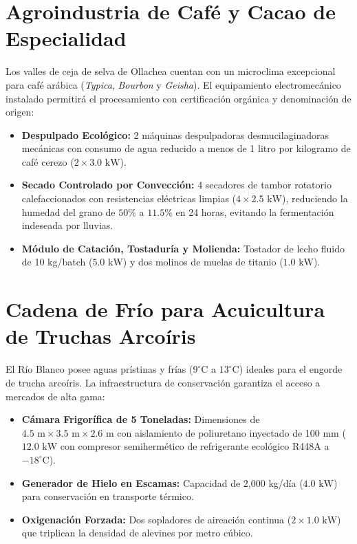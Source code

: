\documentclass[11pt,a4paper]{report}
\begin{document}
\section{Agroindustria de Café y Cacao de Especialidad}
Los valles de ceja de selva de Ollachea cuentan con un microclima excepcional para café arábica (\textit{Typica}, \textit{Bourbon} y \textit{Geisha}). El equipamiento electromecánico instalado permitirá el procesamiento con certificación orgánica y denominación de origen:
\begin{itemize}
    \item \textbf{Despulpado Ecológico:} 2 máquinas despulpadoras desmucilaginadoras mecánicas con consumo de agua reducido a menos de 1 litro por kilogramo de café cerezo ($2 \times 3.0\text{ kW}$).
    \item \textbf{Secado Controlado por Convección:} 4 secadores de tambor rotatorio calefaccionados con resistencias eléctricas limpias ($4 \times 2.5\text{ kW}$), reduciendo la humedad del grano de $50\%$ a $11.5\%$ en 24 horas, evitando la fermentación indeseada por lluvias.
    \item \textbf{Módulo de Catación, Tostaduría y Molienda:} Tostador de lecho fluido de 10 kg/batch ($5.0\text{ kW}$) y dos molinos de muelas de titanio ($1.0\text{ kW}$).
\end{itemize}

\section{Cadena de Frío para Acuicultura de Truchas Arcoíris}
El Río Blanco posee aguas prístinas y frías ($9^\circ\text{C}$ a $13^\circ\text{C}$) ideales para el engorde de trucha arcoíris. La infraestructura de conservación garantiza el acceso a mercados de alta gama:
\begin{itemize}
    \item \textbf{Cámara Frigorífica de 5 Toneladas:} Dimensiones de $4.5\text{ m} \times 3.5\text{ m} \times 2.6\text{ m}$ con aislamiento de poliuretano inyectado de 100 mm ($12.0\text{ kW}$ con compresor semihermético de refrigerante ecológico R448A a $-18^\circ\text{C}$).
    \item \textbf{Generador de Hielo en Escamas:} Capacidad de 2,000 kg/día ($4.0\text{ kW}$) para conservación en transporte térmico.
    \item \textbf{Oxigenación Forzada:} Dos sopladores de aireación continua ($2 \times 1.0\text{ kW}$) que triplican la densidad de alevines por metro cúbico.
\end{itemize}
\end{document}
